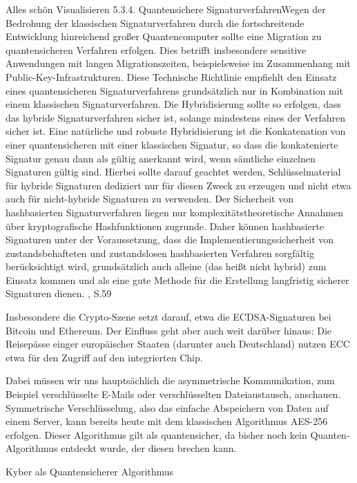Alles schön Visualisieren
5.3.4. Quantensichere SignaturverfahrenWegen der Bedrohung der klassischen Signaturverfahren durch die fortschreitende Entwicklung
hinreichend großer Quantencomputer sollte eine Migration zu quantensicheren Verfahren erfolgen. Dies betrifft insbesondere sensitive Anwendungen mit langen Migrationszeiten, beispielsweise
im Zusammenhang mit Public-Key-Infrastrukturen.
Diese Technische Richtlinie empfiehlt den Einsatz eines quantensicheren Signaturverfahrens
grundsätzlich nur in Kombination mit einem klassischen Signaturverfahren. Die Hybridisierung
sollte so erfolgen, dass das hybride Signaturverfahren sicher ist, solange mindestens eines der
Verfahren sicher ist. Eine natürliche und robuste Hybridisierung ist die Konkatenation von einer
quantensicheren mit einer klassischen Signatur, so dass die konkatenierte Signatur genau dann
als gültig anerkannt wird, wenn sämtliche einzelnen Signaturen gültig sind. Hierbei sollte darauf
geachtet werden, Schlüsselmaterial für hybride Signaturen dediziert nur für diesen Zweck zu
erzeugen und nicht etwa auch für nicht-hybride Signaturen zu verwenden.
Der Sicherheit von hashbasierten Signaturverfahren liegen nur komplexitätstheoretische Annahmen über kryptografische Hashfunktionen zugrunde. Daher können hashbasierte Signaturen
unter der Voraussetzung, dass die Implementierungssicherheit von zustandsbehafteten und zustandslosen hashbasierten Verfahren sorgfältig berücksichtigt wird, grundsätzlich auch alleine (das
heißt nicht hybrid) zum Einsatz kommen und als eine gute Methode für die Erstellung langfristig
sicherer Signaturen dienen. \cite{bundesamt26}, S.59


Insbesondere die Crypto-Szene setzt darauf, etwa die ECDSA-Signaturen bei Bitcoin und Ethereum.
Der Einfluss geht aber auch weit darüber hinaus: Die Reisepässe einger europäischer Staaten (darunter auch Deutschland) nutzen ECC etwa für den Zugriff auf den integrierten Chip.

Dabei müssen wir uns hauptsächlich die asymmetrische Kommunikation, zum Beispiel verschlüsselte E-Mails oder verschlüsselten Dateiaustausch, anschauen. Symmetrische Verschlüsselung, also das einfache Abspeichern von Daten auf einem Server, kann bereits heute mit dem klassischen Algorithmus AES-256 erfolgen. Dieser Algorithmus gilt als quantensicher, da bisher noch kein Quanten-Algorithmus entdeckt wurde, der diesen brechen kann. 

Kyber als Quantensicherer Algorithmus